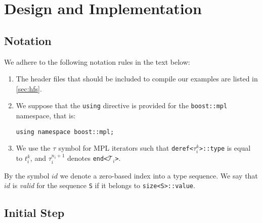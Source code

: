 \documentclass[10pt,a4paper]{article}
\theoremstyle{definition}\newtheorem{problem}{Problem}
\providecommand{\symtypeset}[1]{\ensuremath{\mathcal{T}_{#1}}}
\providecommand{\symtype}[2]{\ensuremath{t_{#1}^{#2}}}
\providecommand{\symiter}[2]{\ensuremath{\tau_{#1}^{#2}}}
\providecommand{\symiterend}[1]{\ensuremath{\tau_{#1}^{n_i+1}}}
\providecommand{\symidb}{\ensuremath{\mathit{id}}}
\providecommand{\symidbx}{\symidb\xspace}
\begin{document}
\section{Design and Implementation}
\label{sec:design}

\subsection{Notation}

We adhere to the following notation rules in the text below:
\begin{enumerate}

\item The header files that should be included to compile our examples are listed in \autoref{sec:hfs}.

\item We suppose that the \texttt{using} directive is provided for the \texttt{boost::mpl} namespace, that is:
\begin{lstlisting}
using namespace boost::mpl;
\end{lstlisting}


\item We use the \symiter{}{} symbol for MPL iterators such that \texttt{deref<}\symiter{i}{k}\texttt{>::type} is equal to \symtype{i}{k},
and \symiterend{i} denotes \texttt{end<}\symtypeset{i}\texttt{>}.

\end{enumerate}
By the symbol \symidbx we denote a zero-based index into a type sequence. We say that \symidbx is \emph{valid} for the sequence \texttt{S} if it belongs to \texttt{size<S>::value}.

\subsection{Initial Step}
\label{sec:initstep}
\end{document}
